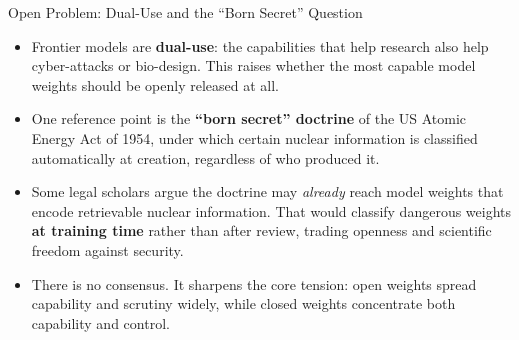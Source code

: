 \begin{frame}{Open Problem: Dual-Use and the ``Born Secret'' Question}
  \begin{itemize}\itemsep0.5em
    \item[\textcolor{KAred}{$\blacktriangleright$}] Frontier models are \textbf{dual-use}: the capabilities that help research also help cyber-attacks or bio-design. This raises whether the most capable model weights should be openly released at all.
    \item[\textcolor{KAred}{$\blacktriangleright$}] One reference point is the \textbf{``born secret'' doctrine} of the US Atomic Energy Act of 1954, under which certain nuclear information is classified automatically at creation, regardless of who produced it.
    \item[\textcolor{KAred}{$\blacktriangleright$}] Some legal scholars argue the doctrine may \emph{already} reach model weights that encode retrievable nuclear information. That would classify dangerous weights \textbf{at training time} rather than after review, trading openness and scientific freedom against security.
    \item[\textcolor{KAred}{$\blacktriangleright$}] There is no consensus. It sharpens the core tension: open weights spread capability and scrutiny widely, while closed weights concentrate both capability and control.
  \end{itemize}
\end{frame}
